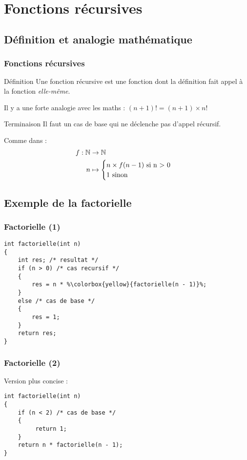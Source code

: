 \documentclass[xcolor=svgnames]{beamer}
\begin{document}
\section[Récursion]{Fonctions récursives}
\subsection{Définition et analogie mathématique}
\begin{frame}
  \frametitle{Fonctions récursives}

  \begin{block}{Définition}
    Une fonction récursive est une fonction dont la définition fait
    appel à la fonction \emph{elle-même}.
  \end{block}


Il y a une forte analogie avec les maths : $(n + 1)! = (n + 1) \times n!$

\begin{alertblock}{Terminaison}
  Il faut un cas de base qui ne déclenche pas d'appel récursif.
\end{alertblock}

Comme
  dans :
\begin{align*}
  f: \mathbb{N} &\to \mathbb{N} \\
  n &\mapsto
  \begin{cases}
    n\times f(n-1) \text{ si  n > 0}\\
    1 \text{ sinon}
  \end{cases}
\end{align*}
\end{frame}

\subsection{Exemple de la factorielle}
\begin{frame}[fragile]
  \frametitle{Factorielle (1)}
\begin{lstlisting}[escapechar={\%},basicstyle=\ttfamily\small] 
int factorielle(int n)
{
    int res; /* resultat */ 
    if (n > 0) /* cas recursif */
    {
        res = n * %\colorbox{yellow}{factorielle(n - 1)}%; 
    } 
    else /* cas de base */ 
    {
        res = 1; 
    }
    return res;
}
\end{lstlisting}
\end{frame}

\begin{frame}[fragile]
  \frametitle{Factorielle (2)}

Version plus concise :
\begin{lstlisting}[escapechar={\%},basicstyle=\ttfamily\small] 
int factorielle(int n)
{
    if (n < 2) /* cas de base */
    {
         return 1;
    } 
    return n * factorielle(n - 1); 
}
\end{lstlisting}
\end{frame}
\end{document}
